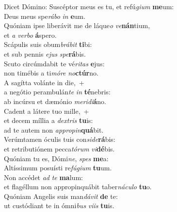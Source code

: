 \evenverse Dicet Dómino: Suscéptor meus es tu, et refú\textit{gi}\textit{um} \textbf{me}um:~\*\\
\evenverse Deus meus spe\textit{rá}\textit{bo} \textit{in} \textbf{e}um.\\
\oddverse Quóniam ipse liberávit me de láque\textit{o} \textit{ve}\textbf{nán}tium,~\*\\
\oddverse et \textit{a} \textit{ver}\textit{bo} \textbf{á}spero.\\
\evenverse Scápulis suis obum\textit{brá}\textit{bit} \textbf{ti}bi:~\*\\
\evenverse et sub pennis \textit{e}\textit{jus} \textit{spe}\textbf{rá}bis.\\
\oddverse Scuto circúmdabit te vé\textit{ri}\textit{tas} \textbf{e}jus:~\*\\
\oddverse non timébis a ti\textit{mó}\textit{re} \textit{no}\textbf{ctúr}no.\\
\evenverse A sagítta volánte in die,~+\\
\evenverse  a negótio perambulán\textit{te} \textit{in} \textbf{té}nebris:~\*\\
\evenverse ab incúrsu et dæmónio \textit{me}\textit{ri}\textit{di}\textbf{á}no.\\
\oddverse Cadent a látere tuo mille,~+\\
\oddverse  et decem míllia a \textit{dex}\textit{tris} \textbf{tu}is:~\*\\
\oddverse ad te autem non \textit{ap}\textit{pro}\textit{pin}\textbf{quá}bit.\\
\evenverse Verúmtamen óculis tuis con\textit{si}\textit{de}\textbf{rá}bis:~\*\\
\evenverse et retributiónem pecca\textit{tó}\textit{rum} \textit{vi}\textbf{dé}bis.\\
\oddverse Quóniam tu es, Dómi\textit{ne}, \textit{spes} \textbf{me}a:~\*\\
\oddverse Altíssimum posuísti re\textit{fú}\textit{gi}\textit{um} \textbf{tu}um.\\
\evenverse Non accédet \textit{ad} \textit{te} \textbf{ma}lum:~\*\\
\evenverse et flagéllum non appropinquábit taber\textit{ná}\textit{cu}\textit{lo} \textbf{tu}o.\\
\oddverse Quóniam Angelis suis man\textit{dá}\textit{vit} \textbf{de} te:~\*\\
\oddverse ut custódiant te in ómni\textit{bus} \textit{vi}\textit{is} \textbf{tu}is.\\
